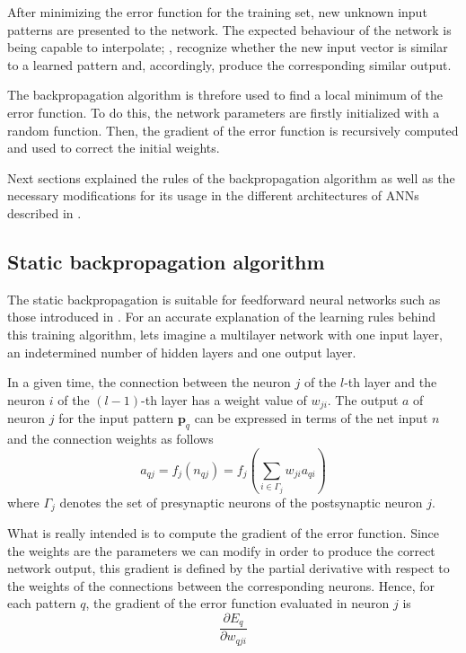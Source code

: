 After minimizing the error function for the training set, 
new unknown input patterns are presented to the network. 
The expected behaviour of the network is being capable to interpolate; 
\ie, recognize whether the new input vector is similar to a learned pattern 
and, accordingly, produce the corresponding similar output.

The backpropagation algorithm is threfore used to find a local minimum of the error function. 
To do this, the network parameters are firstly initialized with a random function. 
Then, the gradient of the error function is recursively computed and
used to correct the initial weights.

Next sections explained the rules of the backpropagation algorithm as well as the necessary modifications for its usage in the different architectures of ANNs described in .

\subsection{Static backpropagation algorithm}
\label{subsec:staticbackprop}
The static backpropagation is suitable for feedforward neural networks such as those introduced in . For an accurate explanation of the learning rules behind this training algorithm, lets imagine a multilayer network with one input layer, an indetermined number of hidden layers and one output layer.

In a given time, the connection between the neuron $j$ of the $l$-th layer and the neuron $i$ of the $(l-1)$-th layer has a weight value of $w_{ji}$. The output $a$ of neuron $j$ for the input pattern $\mathbf{p}_{q}$ can be expressed in terms of the net input $n$ and the connection weights as follows
\begin{equation}
a_{qj}=f_{j}(n_{qj})=f_{j}(\sum_{i\in \Gamma_{j}}w_{ji}a_{qi})
\label{eq:neuronjoutput}
\end{equation}
where $\Gamma_{j}$ denotes the set of presynaptic neurons of the postsynaptic neuron $j$.

What is really intended is to compute the gradient of the error function. 
Since the weights are the parameters we can modify in order to produce the correct network output, 
this gradient is defined by the partial derivative with respect to the weights of the connections between the corresponding neurons. Hence, for each pattern $q$, the gradient of the error function evaluated in neuron $j$ is
\begin{equation}
\frac{\partial E_{q}}{\partial w_{qji}}
\label{eq:gradienterrorfunction}
\end{equation}

